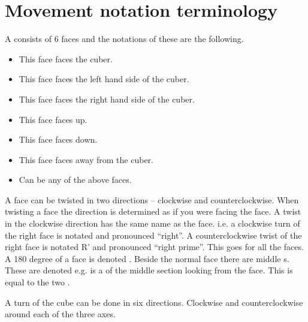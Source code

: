 \section{Movement notation terminology}
\label{sec:moveNotation}
A \cube{} consists of 6 faces and the notations of these are the following.
\begin{itemize}
\item {}This face faces the cuber.
\item {}This face faces the left hand side of the cuber.
\item {}This face faces the right hand side of the cuber.
\item {}This face faces up.
\item {}This face faces down.
\item {}This face faces away from the cuber.
\item {}Can be any of the above faces.
\end{itemize} 

A face can be twisted in two directions -- clockwise and counterclockwise. When twisting a face the direction is determined as if you were facing the face.
A twist in the clockwise direction has the same name as the face. i.e. a clockwise turn of the right face is notated  and pronounced ``right''.
A counterclockwise twist of the right face is notated R' and pronounced ``right prime''. This goes for all the faces.
A 180 degree \twist{} of a face is denoted . 
Beside the normal face \twist{} there are middle \twist{}s. These are denoted  e.g.  is a \twist{} of the middle section looking from the  face. This \twist{} is equal to the two \twist{} .  

A turn of the cube can be done in six directions. Clockwise and counterclockwise around each of the three axes.

